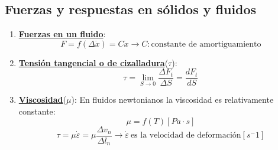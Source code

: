 \subsection{Fuerzas y respuestas en sólidos y fluidos}
\begin{enumerate}
	\item \underline{\textbf{Fuerzas en un fluido}}:
	\[F=f(\Delta \dot{x})=C\dot{x} \rightarrow C: \text{constante de amortiguamiento}\]
	
	\item \underline{\textbf{Tensión tangencial o de cizalladura}}($\tau$):
	\[\tau=\lim_{{S \to 0}} \frac{\Delta F_t}{\Delta S}=\frac{dF_t}{dS}\]
	\item \underline{\textbf{Viscosidad}}($\mu$):
	En fluidos newtonianos la viscosidad es relativamente constante: 
	\[\mu=f(T) [Pa \cdot s]\]
	\[\tau =\mu \dot{\varepsilon} = \mu \frac{\Delta v_n}{\Delta l_n} \rightarrow \dot{\varepsilon}\ \text{es la velocidad de deformación} [s^-1]\]


\end{enumerate}

